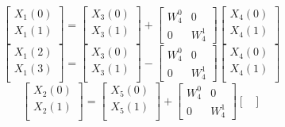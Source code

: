 \documentclass[journal,12pt,twocolumn]{IEEEtran}
\renewcommand\thesection{\arabic{section}}
\begin{document}
\begin{enumerate}[label=\thesection.\arabic*]
\begin{equation}
\begin{bmatrix}
		X_{1}(0) \\ 
		X_{1}(1)\\ 
	\end{bmatrix}
	=
	\begin{bmatrix}
		X_{3}(0) \\ 
		X_{3}(1)\\ 
	\end{bmatrix}
	+
	\begin{bmatrix}
		W^{0}_{4} & 0\\
		0 & W^{1}_{4}
	\end{bmatrix}
	\begin{bmatrix}
		X_{4}(0) \\ 
		X_{4}(1) \\ 
	\end{bmatrix}
	\label{eq:4-1-high}
\end{equation}
\begin{equation}
	\begin{bmatrix}
		X_{1}(2) \\ 
		X_{1}(3)\\ 
	\end{bmatrix}
	=
	\begin{bmatrix}
		X_{3}(0) \\ 
		X_{3}(1)\\ 
	\end{bmatrix}
	-
	\begin{bmatrix}
		W^{0}_{4} & 0\\
		0 & W^{1}_{4}
	\end{bmatrix}
	\begin{bmatrix}
		X_{4}(0) \\ 
		X_{4}(1) \\ 
	\end{bmatrix}
	\label{eq:4-1-low}
\end{equation}
\begin{equation}
	\begin{bmatrix}
		X_{2}(0) \\ 
		X_{2}(1)\\ 
	\end{bmatrix}
	=
	\begin{bmatrix}
		X_{5}(0) \\ 
		X_{5}(1)\\ 
	\end{bmatrix}
	+
	\begin{bmatrix}
		W^{0}_{4} & 0\\
		0 & W^{1}_{4}
	\end{bmatrix}
	\begin{bmatrix}

\end{bmatrix}
\end{equation}
\end{enumerate}
\end{document}
